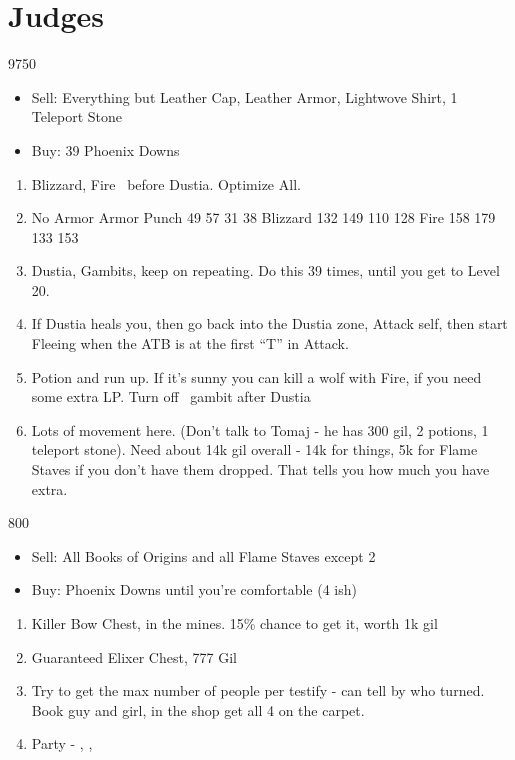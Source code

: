 \chapter{Judges}

\begin{shop}{9750}
\begin{itemize}
\item Sell: Everything but Leather Cap, Leather Armor, Lightwove Shirt, 1 Teleport Stone
\item Buy: 39 Phoenix Downs
\end{itemize}
\end{shop}
\begin{enumerate}
\item Blizzard, Fire \vaan\ before Dustia. Optimize All.
\item 	No Armor		Armor	
Punch	49	57	31	38
Blizzard	132	149	110	128
Fire	158	179	133	153
\item Dustia, Gambits, keep on repeating. Do this 39 times, until you get to Level 20.
\item If Dustia heals you, then go back into the Dustia zone, Attack self, then start Fleeing when the ATB is at the first ``T'' in Attack.
\item Potion and run up. If it's sunny you can kill a wolf with Fire, if you need some extra LP. Turn off \vaan\ gambit after Dustia
\item Lots of movement here. (Don't talk to Tomaj - he has 300 gil, 2 potions, 1 teleport stone). Need about 14k gil overall - 14k for things, 5k for Flame Staves if you don't have them dropped. That tells you how much you have extra.
\end{enumerate}
\begin{shop}{800}
\begin{itemize}
\item Sell: All Books of Origins and all Flame Staves except 2
\item Buy: Phoenix Downs until you're comfortable (4 ish)
\end{itemize}
\end{shop}
\begin{enumerate}
\item Killer Bow Chest, in the mines. 15\% chance to get it, worth 1k gil
\item Guaranteed Elixer Chest, 777 Gil
\item Try to get the max number of people per testify - can tell by who turned. Book guy and girl, in the shop get all 4 on the carpet.
\item Party - \vaan, \balthier, \basch
\end{enumerate}
